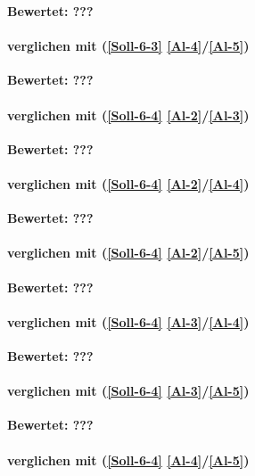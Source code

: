 \textbf{Bewertet: ???}


\paragraph*{  verglichen mit  (\ref{Soll-6-3} \ref{Al-4}/\ref{Al-5})}

\textbf{Bewertet: ???}

\paragraph*{  verglichen mit  (\ref{Soll-6-4} \ref{Al-2}/\ref{Al-3})}

\textbf{Bewertet: ???}

\paragraph*{  verglichen mit  (\ref{Soll-6-4} \ref{Al-2}/\ref{Al-4})}

\textbf{Bewertet: ???}

\paragraph*{  verglichen mit  (\ref{Soll-6-4} \ref{Al-2}/\ref{Al-5})}

\textbf{Bewertet: ???}

\paragraph*{  verglichen mit  (\ref{Soll-6-4} \ref{Al-3}/\ref{Al-4})}

\textbf{Bewertet: ???}

\paragraph*{  verglichen mit  (\ref{Soll-6-4} \ref{Al-3}/\ref{Al-5})}

\textbf{Bewertet: ???}


\paragraph*{  verglichen mit  (\ref{Soll-6-4} \ref{Al-4}/\ref{Al-5})}

